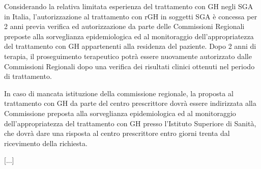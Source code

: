 Considerando la relativa limitata esperienza del trattamento con GH negli SGA in Italia, l'autorizzazione al
trattamento con rGH in soggetti SGA \`e concessa per 2 anni previa verifica ed autorizzazione da parte delle
Commissioni Regionali preposte alla sorveglianza epidemiologica ed al monitoraggio dell'appropriatezza del
trattamento con GH appartenenti alla residenza del paziente. Dopo 2 anni di terapia, il proseguimento
terapeutico potr\`a essere nuovamente autorizzato dalle Commissioni Regionali dopo una verifica dei risultati
clinici ottenuti nel periodo di trattamento.

In caso di mancata istituzione della commissione regionale, la proposta al trattamento con GH da parte del
centro prescrittore dovr\`a essere indirizzata alla Commissione preposta alla sorveglianza epidemiologica ed al
monitoraggio dell'appropriatezza del trattamento con GH presso l'Istituto Superiore di Sanit\`a, che dovr\`a dare
una risposta al centro prescrittore entro giorni trenta dal ricevimento della richiesta.

[...]